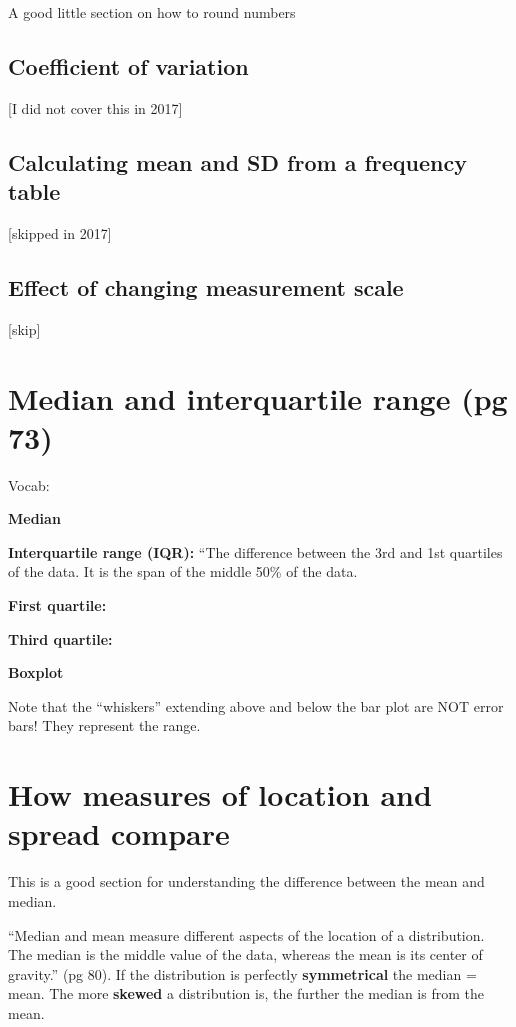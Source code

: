\documentclass[]{book}
\theoremstyle{definition}
\theoremstyle{definition}
\theoremstyle{definition}
\theoremstyle{remark}
\begin{document}
A good little section on how to round numbers

\subsection{Coefficient of variation}\label{coefficient-of-variation}

{[}I did not cover this in 2017{]}

\subsection{Calculating mean and SD from a frequency
table}\label{calculating-mean-and-sd-from-a-frequency-table}

{[}skipped in 2017{]}

\subsection{Effect of changing measurement
scale}\label{effect-of-changing-measurement-scale}

{[}skip{]}

\section{Median and interquartile range (pg
73)}\label{median-and-interquartile-range-pg-73}

Vocab:

\textbf{Median}

\textbf{Interquartile range (IQR):} ``The difference between the 3rd and
1st quartiles of the data. It is the span of the middle 50\% of the
data.

\textbf{First quartile:}

\textbf{Third quartile:}

\textbf{Boxplot}

Note that the ``whiskers'' extending above and below the bar plot are
NOT error bars! They represent the range.

\section{How measures of location and spread
compare}\label{how-measures-of-location-and-spread-compare}

This is a good section for understanding the difference between the mean
and median.

``Median and mean measure different aspects of the location of a
distribution. The median is the middle value of the data, whereas the
mean is its center of gravity.'' (pg 80). If the distribution is
perfectly \textbf{symmetrical} the median = mean. The more
\textbf{skewed} a distribution is, the further the median is from the
mean.
\end{document}

